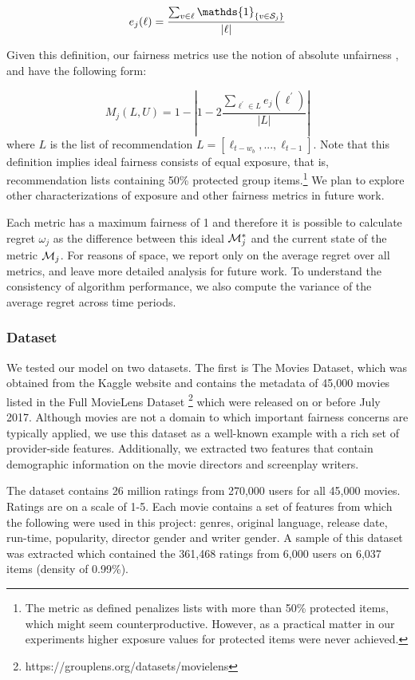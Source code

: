 \begin{equation}
    e_j(\ell) = \frac{\sum_{v \in \ell}{\mathds{1}_{\{v \in \sensitive_j\}}}}{|\ell|}
\end{equation}

Given this definition, our fairness metrics use the notion of absolute unfairness \cite{yao2017beyond}, and have the following form:

\begin{equation}
    M_j(L, U) = 1 - | 1 - 2 \frac{\sum_{\ell^{\prime} \in L}{e_j(\ell^{\prime})}}{|L|} |
\end{equation}
where $L$ is the list of recommendation $L = [\ell_{t-w_b},...,\ell_{t-1}] $. Note that this definition implies ideal fairness consists of equal exposure, that is, recommendation lists containing 50\% protected group items.\footnote{The metric as defined penalizes lists with more than 50\% protected items, which might seem counterproductive. However, as a practical matter in our experiments higher exposure values for protected items were never achieved.} We plan to explore other characterizations of exposure and other fairness metrics in future work. 

Each metric has a maximum fairness of 1 and therefore it is possible to calculate regret $\omega_j$ as the difference between this ideal $\mathcal{M}_j^*$ and the current state of the metric $\mathcal{M}_j$. For reasons of space, we report only on the average regret over all metrics, and leave more detailed analysis for future work. To understand the consistency of algorithm performance, we also compute the variance of the average regret across time periods.

\subsubsection{\textbf{Dataset}}
\hfill

We tested our model on two datasets. The first is The Movies Dataset, which was obtained from the Kaggle website and contains the metadata of 45,000 movies listed in the Full MovieLens Dataset \footnote{https://grouplens.org/datasets/movielens} which were released on or before July 2017. Although movies are not a domain to which important fairness concerns are typically applied, we use this dataset as a well-known example with a rich set of provider-side features. Additionally, we extracted two features that contain demographic information on the movie directors and screenplay writers.

The dataset contains 26 million ratings from 270,000 users for all 45,000 movies. Ratings are on a scale of 1-5. Each movie contains a set of features from which the following were used in this project: genres, original language, release date, run-time, popularity, director gender and writer gender. A sample of this dataset was extracted which contained the 361,468 ratings from 6,000 users on 6,037 items (density of 0.99\%). 

